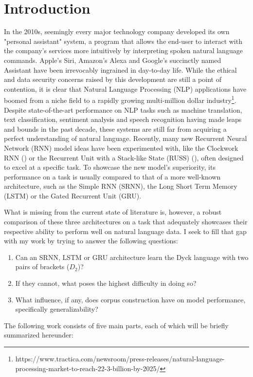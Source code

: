 \section{Introduction}\label{ch:introduction}
In the 2010s, seemingly every major technology company developed its own "personal assistant" system, a program that allows the end-user to interact with the company's services more intuitively by interpreting spoken natural language commands. Apple's Siri, Amazon's Alexa and Google's succinctly named Assistant have been irrevocably ingrained in day-to-day life. While the ethical and data security concerns raised by this development are still a point of contention, it is clear that Natural Language Processing (NLP) applications have boomed from a niche field to a rapidly growing multi-million dollar industry\footnote{https://www.tractica.com/newsroom/press-releases/natural-language-processing-market-to-reach-22-3-billion-by-2025/}.
Despite state-of-the-art performance on NLP tasks such as machine translation, text classification, sentiment analysis and speech recognition having made leaps and bounds in the past decade, these systems are still far from acquiring a perfect understanding of natural language. Recently, many new Recurrent Neural Network (RNN) model ideas have been experimented with, like the Clockwork RNN (\cite{Koutnik2014}) or the Recurrent Unit with a Stack-like State (RUSS) (\cite{Bernardy2018}), often designed to excel at a specific task. To showcase the new model's superiority, its performance on a task is usually compared to that of a more well-known architecture, such as the Simple RNN (SRNN), the Long Short Term Memory (LSTM) or the Gated Recurrent Unit (GRU).

What is missing from the current state of literature is, however, a robust comparison of these three architectures on a task that adequately showcases their respective ability to perform well on natural language data. I seek to fill that gap with my work by trying to answer the following questions:
\begin{enumerate}
\item Can an SRNN, LSTM or GRU architecture learn the Dyck language with two pairs of brackets ($D_{2}$)?
\item If they cannot, what poses the highest difficulty in doing so?
\item What influence, if any, does corpus construction have on model performance, specifically generalizability?
\end{enumerate}
The following work consists of five main parts, each of which will be briefly summarized hereunder:

